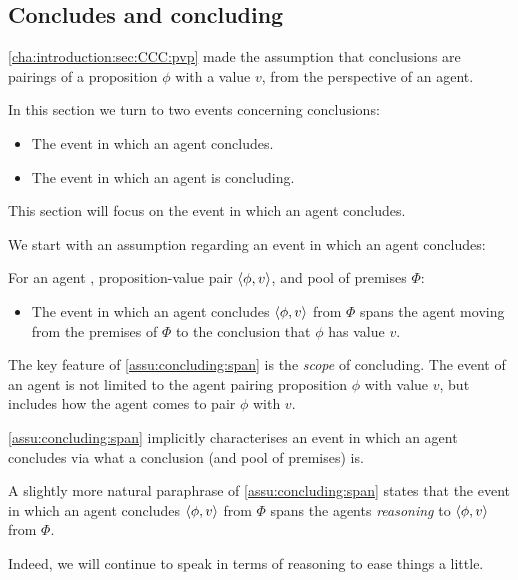 \subsection{Concludes and concluding}
\label{cha:introduction:sec:CCC:c-and-c}

\begin{note}
  \autoref{cha:introduction:sec:CCC:pvp} made the assumption that conclusions are pairings of a proposition \(\phi\) with a value \(v\), from the perspective of an agent.

  In this section we turn to two events concerning conclusions:
  \begin{itemize}
  \item
    The event in which an agent concludes.
  \item
    The event in which an agent is concluding.
  \end{itemize}
  This section will focus on the event in which an agent concludes.
\end{note}

\begin{note}
  We start with an assumption regarding an event in which an agent concludes:

  \begin{assumption}
    \label{assu:concluding:span}
    For an agent \vAgent{}, proposition-value pair \(\langle \phi, v \rangle\), and pool of premises \(\Phi\):

    \begin{itemize}
    \item
      The event in which an agent concludes \(\langle \phi, v \rangle\) from \(\Phi\) spans the agent moving from the premises of \(\Phi\) to the conclusion that \(\phi\) has value \(v\).
    \end{itemize}
    \vspace{-\baselineskip}
  \end{assumption}

  The key feature of \autoref{assu:concluding:span}  is the \emph{scope} of concluding.
  The event of an agent is not limited to the agent pairing proposition \(\phi\) with value \(v\), but includes how the agent comes to pair \(\phi\) with \(v\).

  \autoref{assu:concluding:span} implicitly characterises an event in which an agent concludes via what a conclusion (and pool of premises) is.

  A slightly more natural paraphrase of \autoref{assu:concluding:span} states that the event in which an agent concludes \(\langle \phi, v \rangle\) from \(\Phi\) spans the agents \emph{reasoning} to \(\langle \phi, v \rangle\) from \(\Phi\).

  Indeed, we will continue to speak in terms of reasoning to ease things a little.
\end{note}

